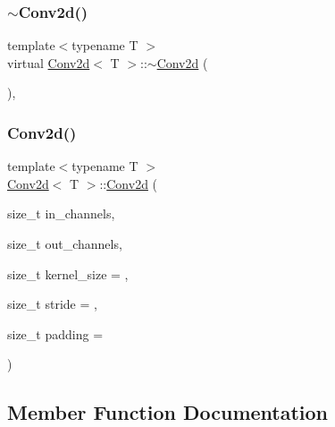 \mbox{\label{class_conv2d_a78911057f811daadff49ec744f063e3c}} 
\subsubsection{\texorpdfstring{$\sim$Conv2d()}{~Conv2d()}}
{\footnotesize\ttfamily template$<$typename T $>$ \\
virtual \mbox{\hyperlink{class_conv2d}{Conv2d}}$<$ T $>$\+::$\sim$\mbox{\hyperlink{class_conv2d}{Conv2d}} (\begin{DoxyParamCaption}{ }\end{DoxyParamCaption})\hspace{0.3cm}{\ttfamily [virtual]}, {\ttfamily [default]}}

\mbox{\label{class_conv2d_a5676e8e1db6826703489568ff32c1436}} 
\subsubsection{\texorpdfstring{Conv2d()}{Conv2d()}\hspace{0.1cm}{\footnotesize\ttfamily [2/2]}}
{\footnotesize\ttfamily template$<$typename T $>$ \\
\mbox{\hyperlink{class_conv2d}{Conv2d}}$<$ T $>$\+::\mbox{\hyperlink{class_conv2d}{Conv2d}} (\begin{DoxyParamCaption}\item[{size\+\_\+t}]{in\+\_\+channels,  }\item[{size\+\_\+t}]{out\+\_\+channels,  }\item[{size\+\_\+t}]{kernel\+\_\+size = {},  }\item[{size\+\_\+t}]{stride = {},  }\item[{size\+\_\+t}]{padding = {} }\end{DoxyParamCaption})}



\subsection{Member Function Documentation}
\mbox{\label{class_conv2d_ab5a54c023efbc6206b8f4aa355e5faa9}} 
